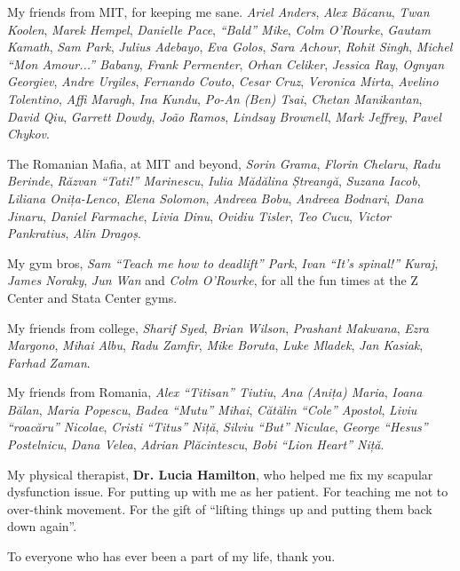 My friends from MIT, for keeping me sane.
\textit{Ariel Anders}, \textit{Alex Băcanu}, \textit{Twan Koolen}, \textit{Marek Hempel}, \textit{Danielle Pace}, \textit{``Bald'' Mike}, \textit{Colm O'Rourke}, \textit{Gautam Kamath}, \textit{Sam Park}, \textit{Julius Adebayo}, \textit{Eva Golos}, \textit{Sara Achour}, \textit{Rohit Singh}, \textit{Michel ``Mon Amour...'' Babany}, \textit{Frank Permenter}, \textit{Orhan Celiker}, \textit{Jessica Ray}, \textit{Ognyan Georgiev}, \textit{Andre Urgiles}, \textit{Fernando Couto}, \textit{Cesar Cruz}, \textit{Veronica Mirta}, \textit{Avelino Tolentino}, \textit{Affi Maragh}, \textit{Ina Kundu}, \textit{Po-An (Ben) Tsai}, \textit{Chetan Manikantan}, \textit{David Qiu}, \textit{Garrett Dowdy}, \textit{João Ramos}, \textit{Lindsay Brownell}, \textit{Mark Jeffrey}, \textit{Pavel Chykov}.

The Romanian Mafia, at MIT and beyond, \textit{Sorin Grama}, \textit{Florin Chelaru}, \textit{Radu Berinde}, \textit{Răzvan ``Tati!'' Marinescu}, \textit{Iulia Mădălina Ștreangă}, \textit{Suzana Iacob}, \textit{Liliana Onița-Lenco}, \textit{Elena Solomon}, \textit{Andreea Bobu}, \textit{Andreea Bodnari}, \textit{Dana Jinaru}, \textit{Daniel Farmache}, \textit{Livia Dinu}, \textit{Ovidiu Tisler}, \textit{Teo Cucu}, \textit{Victor Pankratius}, \textit{Alin Dragoș}.

My gym bros, \textit{Sam ``Teach me how to deadlift'' Park}, \textit{Ivan ``It's spinal!'' Kuraj}, \textit{James Noraky}, \textit{Jun Wan} and \textit{Colm O'Rourke}, for all the fun times at the Z Center and Stata Center gyms.

My friends from college, \textit{Sharif Syed}, \textit{Brian Wilson}, \textit{Prashant Makwana}, \textit{Ezra Margono}, \textit{Mihai Albu}, \textit{Radu Zamfir}, \textit{Mike Boruta}, \textit{Luke Mladek}, \textit{Jan Kasiak}, \textit{Farhad Zaman}.

My friends from Romania, \textit{Alex ``Titisan'' Tiutiu}, \textit{Ana (Anița) Maria}, \textit{Ioana Bălan}, \textit{Maria Popescu}, \textit{Badea ``Mutu'' Mihai}, \textit{Cătălin ``Cole'' Apostol}, \textit{Liviu ``roacăru'' Nicolae}, \textit{Cristi ``Titus'' Niță}, \textit{Silviu ``But'' Niculae}, \textit{George ``Hesus'' Postelnicu}, \textit{Dana Velea}, \textit{Adrian Plăcintescu}, \textit{Bobi ``Lion Heart'' Niță}.

My physical therapist, \textbf{Dr. Lucia Hamilton}, who helped me fix my scapular dysfunction issue.
For putting up with me as her patient.
For teaching me not to over-think movement.
For the gift of ``lifting things up and putting them back down again''.

To everyone who has ever been a part of my life, thank you.
\cleardoublepage